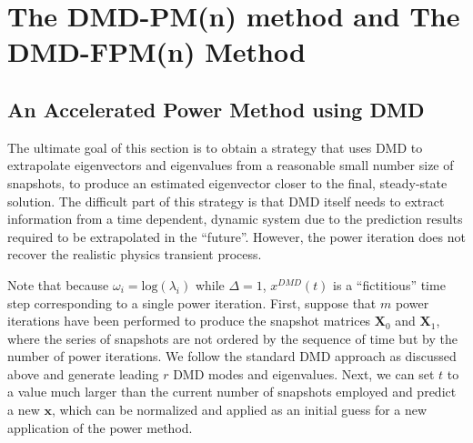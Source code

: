\cleardoublepage

\chapter{The DMD-PM(n) method and The DMD-FPM(n) Method}
\label{chapter:DMD-FPM(n)}

\section{An Accelerated Power Method using DMD}
\label{sec:dmdpi}
The ultimate goal of this section is to obtain a strategy that uses DMD to extrapolate eigenvectors and eigenvalues from a reasonable small number size of snapshots, to produce an estimated eigenvector closer to the final, steady-state solution.
The difficult part of this strategy is that DMD itself needs to extract information from a time dependent, dynamic system due to the prediction results required to be extrapolated in the ``future''.
However, the power iteration does not recover the realistic physics transient process. 

Note that because $\omega_i= \text{log}(\lambda_i)$ while $\Delta = 1$, $x^{DMD}(t)$ is a ``fictitious'' time step corresponding to a single power iteration.
First, suppose that $m$ power iterations have been performed to produce the snapshot matrices $\mathbf{X}_0$ and $\mathbf{X}_1$, where the series of snapshots are not ordered by the sequence of time but by the number of power iterations.
We follow the standard DMD approach as discussed above and generate leading $r$ DMD modes and eigenvalues.
Next, we can set $t$ to a value much larger than the current number of snapshots employed and predict a new $\mathbf{x}$, which can be normalized and applied as an initial guess for a new application of the power method.

